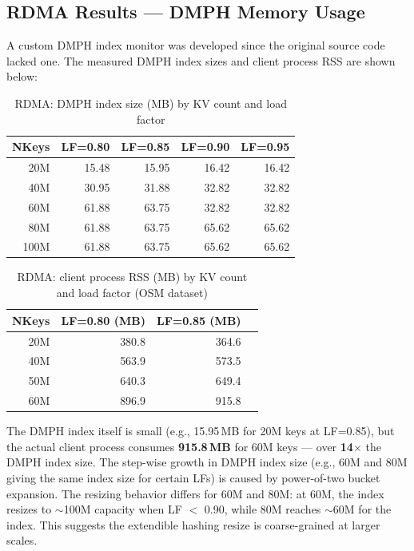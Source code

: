 \documentclass[11pt,a4paper]{article}
\begin{document}
\subsection{RDMA Results --- DMPH Memory Usage}

A custom DMPH index monitor was developed since the original source code lacked one. The measured DMPH index sizes and client process RSS are shown below:

\begin{table}[H]
\centering
\caption{RDMA: DMPH index size (MB) by KV count and load factor}
\label{tab:rdma-dmph}
\small
\begin{tabular}{@{}rrrrr@{}}
\toprule
\textbf{NKeys} & \textbf{LF=0.80} & \textbf{LF=0.85} & \textbf{LF=0.90} & \textbf{LF=0.95} \\
\midrule
20M  & 15.48 & 15.95 & 16.42 & 16.42 \\
40M  & 30.95 & 31.88 & 32.82 & 32.82 \\
60M  & 61.88 & 63.75 & 32.82 & 32.82 \\
80M  & 61.88 & 63.75 & 65.62 & 65.62 \\
100M & 61.88 & 63.75 & 65.62 & 65.62 \\
\bottomrule
\end{tabular}
\end{table}

\begin{table}[H]
\centering
\caption{RDMA: client process RSS (MB) by KV count and load factor (OSM dataset)}
\label{tab:rdma-rss}
\small
\begin{tabular}{@{}rrrr@{}}
\toprule
\textbf{NKeys} & \textbf{LF=0.80 (MB)} & \textbf{LF=0.85 (MB)} \\
\midrule
20M  & 380.8 & 364.6 \\
40M  & 563.9 & 573.5 \\
50M  & 640.3 & 649.4 \\
60M  & 896.9 & 915.8 \\
\bottomrule
\end{tabular}
\end{table}

The DMPH index itself is small (e.g., 15.95\,MB for 20M keys at LF=0.85), but the actual client process consumes \textbf{915.8\,MB} for 60M keys --- over \textbf{14$\times$} the DMPH index size. The step-wise growth in DMPH index size (e.g., 60M and 80M giving the same index size for certain LFs) is caused by power-of-two bucket expansion. The resizing behavior differs for 60M and 80M: at 60M, the index resizes to $\sim$100M capacity when LF $<$ 0.90, while 80M reaches $\sim$60M for the index. This suggests the extendible hashing resize is coarse-grained at larger scales.
\end{document}
